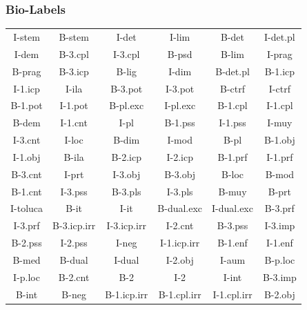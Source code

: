 \documentclass[letterpaper,12pt,oneside]{book}
\begin{document}
\subsubsection{Bio-Labels}

\begin{center}
	\begin{longtable}{| c | c | c | c | c | c |}
		\hline
		I-stem & B-stem & I-det & I-lim & B-det & I-det.pl \\

		I-dem & B-3.cpl & I-3.cpl & B-psd & B-lim & I-prag \\

		B-prag & B-3.icp & B-lig & I-dim & B-det.pl & B-1.icp \\

		I-1.icp & I-ila & B-3.pot & I-3.pot & B-ctrf & I-ctrf \\

		B-1.pot & I-1.pot & B-pl.exc & I-pl.exc & B-1.cpl & I-1.cpl \\

		B-dem & I-1.cnt & I-pl & B-1.pss & I-1.pss & I-muy \\

		I-3.cnt & I-loc & B-dim & I-mod & B-pl & B-1.obj \\

		I-1.obj & B-ila & B-2.icp & I-2.icp & B-1.prf & I-1.prf \\

		B-3.cnt & I-prt & I-3.obj & B-3.obj & B-loc & B-mod \\

		B-1.cnt & I-3.pss & B-3.pls & I-3.pls & B-muy & B-prt \\

		I-toluca & B-it & I-it & B-dual.exc & I-dual.exc & B-3.prf \\

		I-3.prf & B-3.icp.irr & I-3.icp.irr & I-2.cnt & B-3.pss & I-3.imp \\

		B-2.pss & I-2.pss & I-neg & I-1.icp.irr & B-1.enf & I-1.enf \\

		B-med & B-dual & I-dual & I-2.obj & I-aum & B-p.loc \\

		I-p.loc & B-2.cnt & B-2 & I-2 & I-int & B-3.imp \\

		B-int & B-neg & B-1.icp.irr & B-1.cpl.irr & I-1.cpl.irr & B-2.obj \\


\end{longtable}
\end{center}
\end{document}
